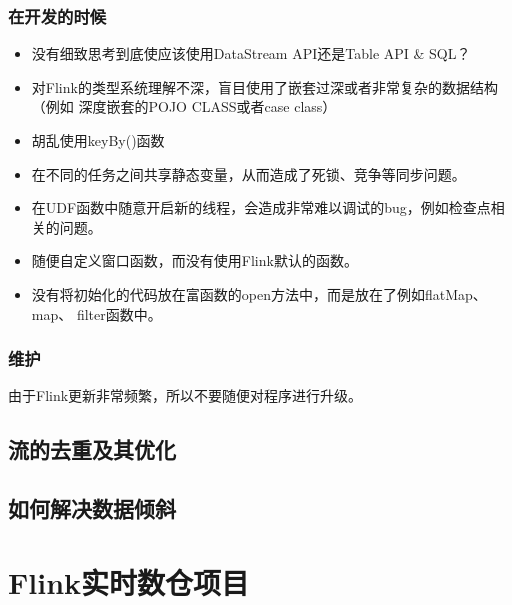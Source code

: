 \documentclass[cn,11pt,chinese]{elegantbook}
\begin{document}
\section{在开发的时候}

\begin{itemize}
\item 没有细致思考到底使应该使用DataStream API还是Table API \& SQL？
\item 对Flink的类型系统理解不深，盲目使用了嵌套过深或者非常复杂的数据结构（例如
  深度嵌套的POJO CLASS或者case class）
\item 胡乱使用keyBy()函数
\item 在不同的任务之间共享静态变量，从而造成了死锁、竞争等同步问题。
\item 在UDF函数中随意开启新的线程，会造成非常难以调试的bug，例如检查点相关的问题。
\item 随便自定义窗口函数，而没有使用Flink默认的函数。
\item 没有将初始化的代码放在富函数的open方法中，而是放在了例如flatMap、map、
  filter函数中。
\end{itemize}

\section{维护}

由于Flink更新非常频繁，所以不要随便对程序进行升级。

\chapter{流的去重及其优化}

\chapter{如何解决数据倾斜}

\part{Flink实时数仓项目}
\end{document}
